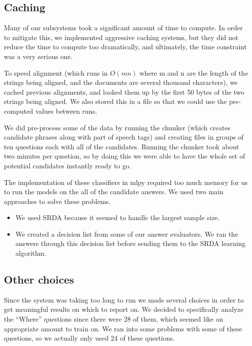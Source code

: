 \documentclass{article}
\begin{document}
\subsection{Caching}

Many of our subsystems took a significant amount of time to compute.  In order
to mitigate this, we implemented aggressive caching systems, but they did not
reduce the time to compute too dramatically, and ultimately, the time constraint
was a very serious one.

To speed alignment (which runs in $O(mn)$ where m and n are the length of the strings being aligned, and the documents are several thousand characters), we cached previous alignments, and looked them up by the first 50 bytes of the two strings being aligned.  We also stored this in a file so that we could use the pre-computed values between runs.

We did pre-process some of the data by running the chunker (which creates
candidate phrases along with part of speech tags) and creating files in
groups of ten questions each with all of the candidates. Running the chunker
took about two minutes per question, so by doing this we were able to have
the whole set of potential candidates instantly ready to go.

The implementation of these classifiers in mlpy required too much memory for
us to run the models on the all of the candidate answers. We used two main approaches
to solve these problems.
\begin{itemize}
\item We used SRDA because it seemed to handle the largest sample size.
\item We created a decision list from some of our answer evaluators. We ran the
answers through this decision list before sending them to the SRDA learning
algorithm.
\end{itemize}

\subsection{Other choices}
Since the system was taking too long to run we made several choices in order
to get meaningful results on which to report on. We decided to specifically analyze
the ``Where'' questions since there were 28 of them, which seemed like an appropriate
amount to train on. We ran into some problems with some of these questions, so we
actually only used 24 of these questions. 
\end{document}
